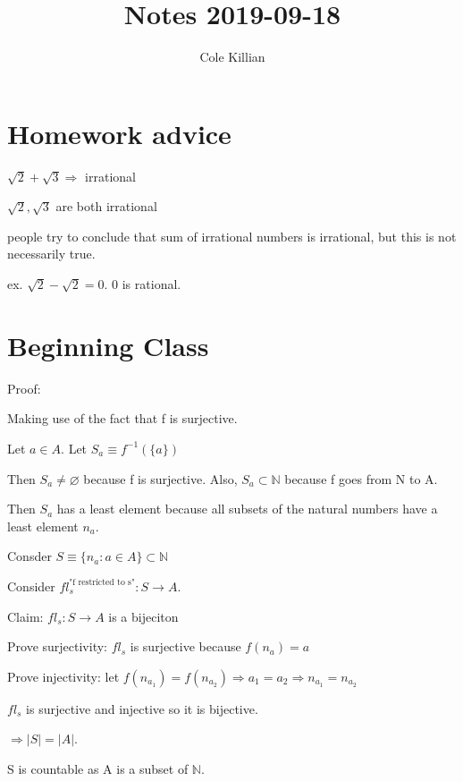 \documentclass{article}
\begin{document}
\title{Notes 2019-09-18}
\author{Cole Killian}

\maketitle

\section{Homework advice}

$\sqrt{2} + \sqrt{3} \Rightarrow$ irrational

$\sqrt{2}, \sqrt{3}$ are both irrational

people try to conclude that sum of irrational numbers is irrational, but this is not necessarily true.

ex. $\sqrt{2} - \sqrt{2} = 0$. 0 is rational.

\section{Beginning Class}

Proof:

Making use of the fact that f is surjective.

Let $a \in A$. Let $S_a \equiv f^{-1}(\{a\})$

Then $S_a \neq \varnothing$ because f is surjective. Also, $S_a \subset \mathbb{N}$ because f goes from N to A.

Then $S_a$ has a least element because all subsets of the natural numbers have a least element $n_a$.

Consder $S \equiv \{n_a: a \in A \} \subset \mathbb{N}$

Consider  $fl_s^{\text{"f restricted to s"}}: S \to A$.

Claim:  $fl_s: S \to A$ is a bijeciton

Prove surjectivity: $fl_s $ is surjective because $f(n_a) = a$ 

Prove injectivity: let  $f(n_{a_1}) = f(n_{a_2}) \Rightarrow a_1 = a_2 \Rightarrow n_{a_1} = n_{a_2}$

 $fl_s$ is surjective and injective so it is bijective.

 $\Rightarrow |S| = |A|$.

 S is countable as A is a subset of $\mathbb{N}$.
\end{document}
